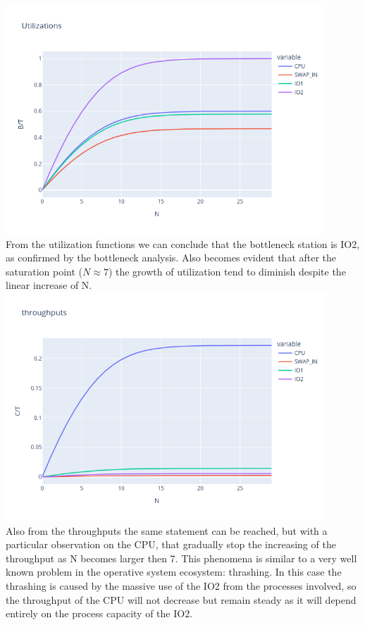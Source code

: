 \documentclass[12pt,a4paper]{article}
\begin{document}
\includegraphics[width=0.9\textwidth]{Images/Utilizations.png}\\
From the utilization functions we can conclude that the bottleneck station is IO2, as confirmed by the bottleneck analysis. Also becomes evident that after the saturation point ($N \approx7$) the growth of utilization tend to diminish despite the linear increase of N.
\\
\includegraphics[width=0.9\textwidth]{Images/throughputs.png}
\\
Also from the throughputs the same statement can be reached, but with a particular observation on the CPU, that gradually stop the increasing of the throughput as N becomes larger then 7. This phenomena is similar to a very well known problem in the operative system ecosystem: thrashing. In this case the thrashing is caused by the massive use of the IO2 from the processes involved, so the throughput of the CPU will not decrease but remain steady as it will depend entirely on the process capacity of the IO2.
\end{document}
